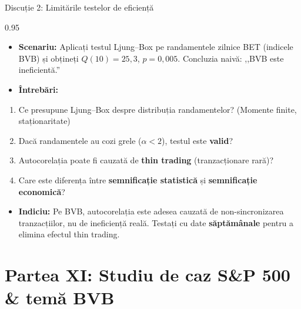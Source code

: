 \documentclass[9pt, aspectratio=169, t]{beamer}
\begin{document}
\begin{frame}[shrink=15]{Discuție 2: Limitările testelor de eficiență}
\begin{cminipage}{0.95\textwidth}
\begin{itemize}\setlength{\itemsep}{0pt}
    \item \textbf{Scenariu:} Aplicați testul Ljung--Box pe randamentele zilnice BET (indicele BVB) și obțineți $Q(10) = 25{,}3$, $p = 0{,}005$. Concluzia naivă: ,,BVB este ineficientă.''
    \item \textbf{Întrebări:}
\end{itemize}
\begin{enumerate}\setlength{\itemsep}{0pt}
    \item Ce presupune Ljung--Box despre distribuția randamentelor? (Momente finite, staționaritate)
    \item Dacă randamentele au cozi grele ($\alpha < 2$), testul este \textbf{valid}?
    \item Autocorelația poate fi cauzată de \textbf{thin trading} (tranzacționare rară)?
    \item Care este diferența între \textbf{semnificație statistică} și \textbf{semnificație economică}?
\end{enumerate}

\vspace{0.2cm}
\begin{itemize}\setlength{\itemsep}{0pt}
    \item \textbf{Indiciu:} Pe BVB, autocorelația este adesea cauzată de non-sincronizarea tranzacțiilor, nu de ineficiență reală. Testați cu date \textbf{săptămânale} pentru a elimina efectul thin trading.
\end{itemize}
\end{cminipage}
\end{frame}

\section{Partea XI: Studiu de caz S\&P 500 \& temă BVB}
\end{document}
